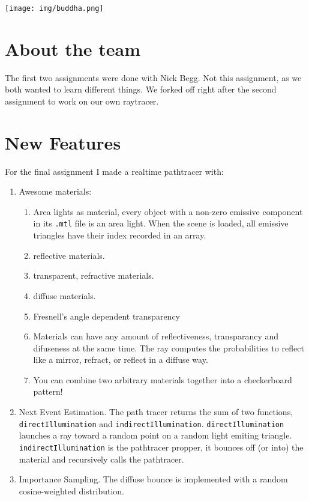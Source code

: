 
\texttt{[image: img/buddha.png]}

\section{About the team}
The first two assignments were done with Nick Begg.
Not this assignment, as we both wanted to learn different things.
We forked off right after the second assignment to work on our own raytracer.

\section{New Features}
For the final assignment I made a realtime pathtracer with:
\begin{enumerate}
    \item Awesome materials:
        \begin{enumerate}
            \item Area lights as material, every object with a non-zero emissive component in its \verb:.mtl: file is an area light.
                  When the scene is loaded, all emissive triangles have their index recorded in an array.
            \item reflective materials.
            \item transparent, refractive materials.
            \item diffuse materials.
            \item Fresnell's angle dependent transparency
            \item Materials can have any amount of reflectiveness, transparancy and difuseness at the same time.
                  The ray computes the probabilities to reflect like a mirror, refract, or reflect in a diffuse way.
            \item You can combine two arbitrary materials together into a checkerboard pattern!
        \end{enumerate}
    \item Next Event Estimation. 
        The path tracer returns the sum of two functions, \verb:directIllumination: and \verb:indirectIllumination:. 
        \verb:directIllumination: launches a ray toward a random point on a random light emiting triangle.
        \verb:indirectIllumination: is the pathtracer propper, it bounces off (or into) the material and recursively calls the pathtracer.
    \item Importance Sampling.
        The diffuse bounce is implemented with a random cosine-weighted distribution.

\end{enumerate}
